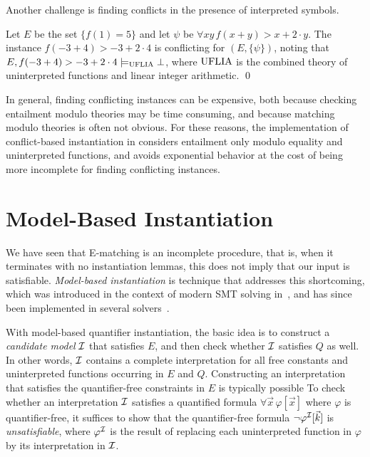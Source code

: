 \documentclass[oribibl]{llncs}
\begin{document}
Another challenge is finding conflicts in the presence of interpreted symbols.
\begin{example}
Let $E$ be the set $\{ f( 1 ) = 5 \}$ and let $\psi$ be $\forall xy\, f( x + y ) > x + 2 \cdot y$.
The instance $f( -3 + 4 ) > -3 + 2 \cdot 4$ is conflicting for $( E, \{ \psi \} )$,
noting that $E, f( -3 + 4 ) > -3 + 2 \cdot 4 \models_{\mathrm{UFLIA}} \bot$, where $\mathrm{UFLIA}$ is the combined
theory of uninterpreted functions and linear integer arithmetic.
\qed
\end{example}
In general, finding conflicting instances can be expensive, both because checking entailment modulo theories may be time consuming,
and because matching modulo theories is often not obvious.
For these reasons,
the implementation of conflict-based instantiation in \cvc
considers entailment only modulo equality and uninterpreted functions,
and avoids exponential behavior at the cost of being more incomplete for finding conflicting instances. 

\section{Model-Based Instantiation}
\label{sec:mbqi}

We have seen that E-matching is an incomplete procedure,
that is, when it terminates with no instantiation lemmas, this does not imply that our input is satisfiable.
\emph{Model-based instantiation} is technique that addresses this shortcoming,
which was introduced in the context of modern SMT solving in~\cite{},
and has since been implemented in several solvers~\cite{}.

With model-based quantifier instantiation, the basic idea is
to construct a \emph{candidate model} $\mathcal{I}$ that satisfies $E$, 
and then check whether $\mathcal{I}$ satisfies $Q$ as well.
In other words, $\mathcal{I}$ contains a complete interpretation for all free constants and uninterpreted functions occurring in $E$ and $Q$.
Constructing an interpretation that satisfies the quantifier-free constraints in $E$
is typically possible 
To check whether an interpretation $\mathcal{I}$ satisfies a quantified formula $\forall \vec x\, \varphi[ \vec x ]$ where $\varphi$ is quantifier-free,
it suffices to show that the quantifier-free formula $\neg \varphi^{\mathcal{I}}[ \vec k ]$ is \emph{unsatisfiable},
where $\varphi^{\mathcal{I}}$ is the result of replacing each uninterpreted function in $\varphi$
by its interpretation in $\mathcal{I}$.

\begin{example}

\end{example}
\end{document}
